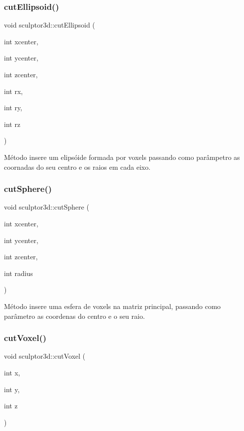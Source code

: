 \subsubsection{\texorpdfstring{cut\+Ellipsoid()}{cutEllipsoid()}}
{\footnotesize\ttfamily void sculptor3d\+::cut\+Ellipsoid (\begin{DoxyParamCaption}\item[{int}]{xcenter,  }\item[{int}]{ycenter,  }\item[{int}]{zcenter,  }\item[{int}]{rx,  }\item[{int}]{ry,  }\item[{int}]{rz }\end{DoxyParamCaption})}

Método insere um elipsóide formada por voxels passando como parâmpetro as coornadas do seu centro e os raios em cada eixo. \mbox{\label{classsculptor3d_a1e8bf7a173f21c6fd805291ae76e94e8}} 
\subsubsection{\texorpdfstring{cut\+Sphere()}{cutSphere()}}
{\footnotesize\ttfamily void sculptor3d\+::cut\+Sphere (\begin{DoxyParamCaption}\item[{int}]{xcenter,  }\item[{int}]{ycenter,  }\item[{int}]{zcenter,  }\item[{int}]{radius }\end{DoxyParamCaption})}

Método insere uma esfera de voxels na matriz principal, passando como parâmetro as coordenas do centro e o seu raio. \mbox{\label{classsculptor3d_a3bc32c45bd4de88a0316e709e63fb54f}} 
\subsubsection{\texorpdfstring{cut\+Voxel()}{cutVoxel()}}
{\footnotesize\ttfamily void sculptor3d\+::cut\+Voxel (\begin{DoxyParamCaption}\item[{int}]{x,  }\item[{int}]{y,  }\item[{int}]{z }\end{DoxyParamCaption})}

